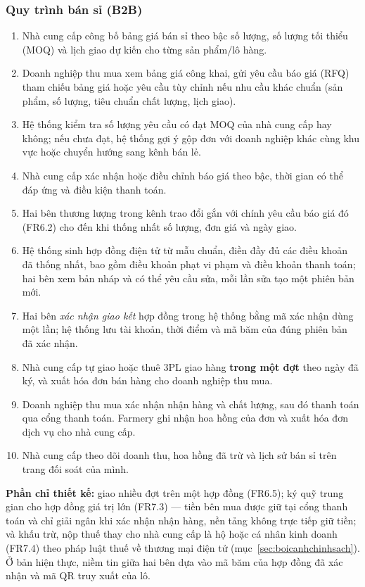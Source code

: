 \subsubsection*{Quy trình bán sỉ (B2B)}
\begin{enumerate}
    \item Nhà cung cấp công bố bảng giá bán sỉ theo bậc số lượng, số lượng tối thiểu (MOQ) và lịch giao dự kiến cho từng sản phẩm/lô hàng.
    \item Doanh nghiệp thu mua xem bảng giá công khai, gửi yêu cầu báo giá (RFQ) tham chiếu bảng giá hoặc yêu cầu tùy chỉnh nếu nhu cầu khác chuẩn (sản phẩm, số lượng, tiêu chuẩn chất lượng, lịch giao).
    \item Hệ thống kiểm tra số lượng yêu cầu có đạt MOQ của nhà cung cấp hay không; nếu chưa đạt, hệ thống gợi ý gộp đơn với doanh nghiệp khác cùng khu vực hoặc chuyển hướng sang kênh bán lẻ.
    \item Nhà cung cấp xác nhận hoặc điều chỉnh báo giá theo bậc, thời gian có thể đáp ứng và điều kiện thanh toán.
    \item Hai bên thương lượng trong kênh trao đổi gắn với chính yêu cầu báo giá đó (FR6.2) cho đến khi thống nhất số lượng, đơn giá và ngày giao.
    \item Hệ thống sinh hợp đồng điện tử từ mẫu chuẩn, điền đầy đủ các điều khoản đã thống nhất, bao gồm điều khoản phạt vi phạm và điều khoản thanh toán; hai bên xem bản nháp và có thể yêu cầu sửa, mỗi lần sửa tạo một phiên bản mới.
    \item Hai bên \emph{xác nhận giao kết} hợp đồng trong hệ thống bằng mã xác nhận dùng một lần; hệ thống lưu tài khoản, thời điểm và mã băm của đúng phiên bản đã xác nhận.
    \item Nhà cung cấp tự giao hoặc thuê 3PL giao hàng \textbf{trong một đợt} theo ngày đã ký, và xuất hóa đơn bán hàng cho doanh nghiệp thu mua.
    \item Doanh nghiệp thu mua xác nhận nhận hàng và chất lượng, sau đó thanh toán qua cổng thanh toán. Farmery ghi nhận hoa hồng của đơn và xuất hóa đơn dịch vụ cho nhà cung cấp.
    \item Nhà cung cấp theo dõi doanh thu, hoa hồng đã trừ và lịch sử bán sỉ trên trang đối soát của mình.
\end{enumerate}

\noindent\textbf{Phần chỉ thiết kế:} giao nhiều đợt trên một hợp đồng (FR6.5); ký quỹ trung gian cho hợp đồng giá trị lớn (FR7.3) --- tiền bên mua được giữ tại cổng thanh toán và chỉ giải ngân khi xác nhận nhận hàng, nền tảng không trực tiếp giữ tiền; và khấu trừ, nộp thuế thay cho nhà cung cấp là hộ hoặc cá nhân kinh doanh (FR7.4) theo pháp luật thuế về thương mại điện tử (mục~\ref{sec:boicanhchinhsach}). Ở bản hiện thực, niềm tin giữa hai bên dựa vào mã băm của hợp đồng đã xác nhận và mã QR truy xuất của lô.


